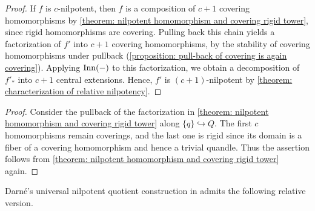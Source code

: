 \begin{proof}
    If $f$ is $c$-nilpotent, then $f$ is a composition of $c+1$ covering homomorphisms by \cref{theorem: nilpotent homomorphism and covering rigid tower}, since rigid homomorphisms are covering. Pulling back this chain yields a factorization of $f'$ into $c+1$ covering homomorphisms, by the stability of covering homomorphisms under pullback (\cref{proposition: pull-back of covering is again covering}). Applying $\operatorname{Inn}(-)$ to this factorization, we obtain a decomposition of $f'_*$ into $c+1$ central extensions. Hence, $f'$ is $(c+1)$-nilpotent by \cref{theorem: characterization of relative nilpotency}.
\end{proof}


\begin{proof}
   Consider the pullback of the factorization in \cref{theorem: nilpotent homomorphism and covering rigid tower} along $\{q\}\hookrightarrow Q$. The first $c$ homomorphisms remain coverings, and the last one is rigid since its domain is a fiber of a covering homomorphism and hence a trivial quandle. Thus the assertion follows from \cref{theorem: nilpotent homomorphism and covering rigid tower} again.
\end{proof}



Darn\'e's universal nilpotent quotient construction in \cite[Proposition~2.15]{darne_2026_nilpotent_quandles} admits the following relative version.


